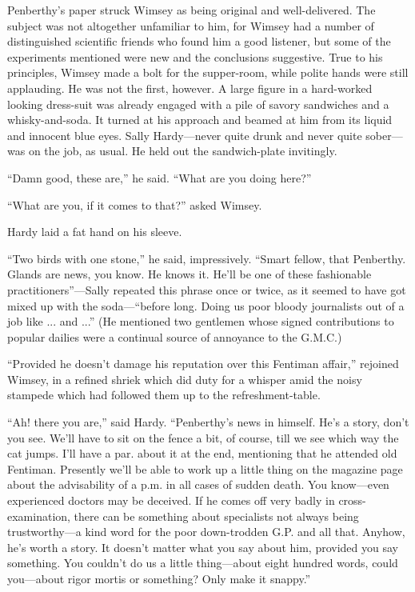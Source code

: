 Penberthy's paper struck Wimsey as being original and well-delivered. The subject was not altogether unfamiliar to him, for Wimsey had a number of distinguished scientific friends who found him a good listener, but some of the experiments mentioned were new and the conclusions suggestive. True to his principles, Wimsey made a bolt for the supper-room, while polite hands were still applauding. He was not the first, however. A large figure in a hard-worked looking dress-suit was already engaged with a pile of savory sandwiches and a whisky-and-soda. It turned at his approach and beamed at him from its liquid and innocent blue eyes. Sally Hardy\allowbreak---\allowbreak never quite drunk and never quite sober\allowbreak---\allowbreak was on the job, as usual. He held out the sandwich-plate invitingly.

\enquote{Damn good, these are,} he said. \enquote{What are you doing here?}

\enquote{What are you, if it comes to that?} asked Wimsey.

Hardy laid a fat hand on his sleeve.

\enquote{Two birds with one stone,} he said, impressively. \enquote{Smart fellow, that Penberthy. Glands are news, you know. He knows it. He'll be one of these fashionable practitioners}---Sally repeated this phrase once or twice, as it seemed to have got mixed up with the soda---\enquote{before long. Doing us poor bloody journalists out of a job like ... and ...} (He mentioned two gentlemen whose signed contributions to popular dailies were a continual source of annoyance to the G.M.C.)

\enquote{Provided he doesn't damage his reputation over this Fentiman affair,} rejoined Wimsey, in a refined shriek which did duty for a whisper amid the noisy stampede which had followed them up to the refreshment-table.

\enquote{Ah! there you are,} said Hardy. \enquote{Penberthy's news in himself. He's a story, don't you see. We'll have to sit on the fence a bit, of course, till we see which way the cat jumps. I'll have a par. about it at the end, mentioning that he attended old Fentiman. Presently we'll be able to work up a little thing on the magazine page about the advisability of a p.m. in all cases of sudden death. You know\allowbreak---\allowbreak even experienced doctors may be deceived. If he comes off very badly in cross-examination, there can be something about specialists not always being trustworthy\allowbreak---\allowbreak a kind word for the poor down-trodden G.P. and all that. Anyhow, he's worth a story. It doesn't matter what you say about him, provided you say something. You couldn't do us a little thing\allowbreak---\allowbreak about eight hundred words, could you\allowbreak---\allowbreak about rigor mortis or something? Only make it snappy.}

